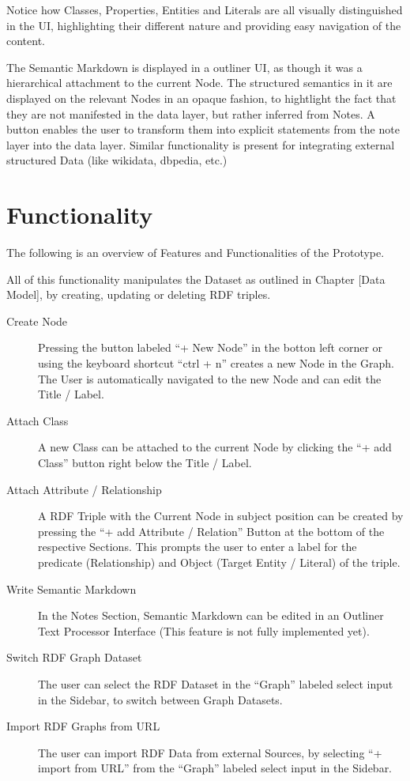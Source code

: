 Notice how Classes, Properties, Entities and Literals are all visually distinguished in the UI, highlighting their different nature and providing easy navigation of the content.

The Semantic Markdown is displayed in a outliner UI, as though it was a hierarchical attachment to the current Node. The structured semantics in it are displayed on the relevant Nodes in an opaque fashion, to hightlight the fact that they are not manifested in the data layer, but rather inferred from Notes. A button enables the user to transform them into explicit statements from the note layer into the data layer. Similar functionality is present for integrating external structured Data (like wikidata, dbpedia, etc.)

\section{Functionality}

The following is an overview of Features and Functionalities of the Prototype.

All of this functionality manipulates the Dataset as outlined in Chapter [Data Model], by creating, updating or deleting RDF triples.
\begin{description}
    \item[Create Node] Pressing the button labeled “+ New Node” in the botton left corner or using the keyboard shortcut “ctrl + n” creates a new Node in the Graph. The User is automatically navigated to the new Node and can edit the Title / Label.
    \item[Attach Class] A new Class can be attached to the current Node by clicking the “+ add Class” button right below the Title / Label.
    \item[Attach Attribute / Relationship] A RDF Triple with the Current Node in subject position can be created by pressing the “+ add Attribute / Relation” Button at the bottom of the respective Sections. This prompts the user to enter a label for the predicate (Relationship) and Object (Target Entity / Literal) of the triple.
    \item[Write Semantic Markdown] In the Notes Section, Semantic Markdown can be edited in an Outliner Text Processor Interface (This feature is not fully implemented yet).
    \item[Switch RDF Graph Dataset] The user can select the RDF Dataset in the “Graph” labeled select input in the Sidebar, to switch between Graph Datasets.
    \item[Import RDF Graphs from URL] The user can import RDF Data from external Sources, by selecting “+ import from URL” from the “Graph” labeled select input in the Sidebar.
\end{description}

